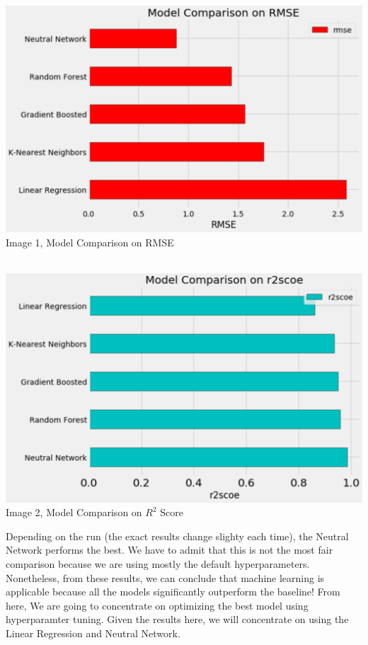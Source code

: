 \documentclass{article}
\begin{document}
\begin{center}
\includegraphics[scale=0.5]{rmse.png}\\
\caption{Image 1, Model Comparison on RMSE}\\
\includegraphics[scale=0.5]{r2score.png} \\
\caption{Image 2, Model Comparison on $R^2$ Score}
\end{center}


Depending on the run (the exact results change slighty each time), the Neutral Network performs the best. We have to admit that this is not the most fair comparison because we are using mostly the default hyperparameters. Nonetheless, from these results, we can conclude that machine learning is applicable because all the models significantly outperform the baseline!
From here, We are going to concentrate on optimizing the best model using hyperparamter tuning. Given the results here, we will concentrate on using the Linear Regression and  Neutral Network.
\end{document}

